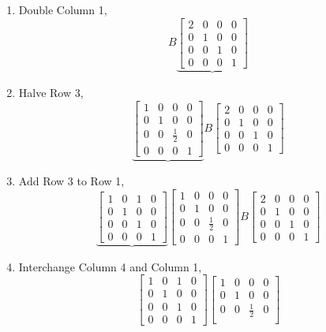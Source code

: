 \documentclass[letterpaper,10pt]{article}
\begin{document}
\begin{enumerate}
\begin{enumerate}
\item Double Column 1,
\[B\underbrace{\begin{bmatrix}
2 & 0 & 0 & 0\\
0 & 1 & 0 & 0\\
0 & 0 & 1 & 0\\
0 & 0 & 0 & 1
\end{bmatrix}} \]
\item Halve Row 3,
\[\underbrace{\begin{bmatrix}
1 & 0 & 0 & 0\\
0 & 1 & 0 & 0\\
0 & 0 & \frac{1}{2} & 0\\
0 & 0 & 0 & 1
\end{bmatrix}}B\begin{bmatrix}
2 & 0 & 0 & 0\\
0 & 1 & 0 & 0\\
0 & 0 & 1 & 0\\
0 & 0 & 0 & 1
\end{bmatrix} \]
\item Add Row 3 to Row 1,
\[\underbrace{\begin{bmatrix}
1 & 0 & 1 & 0\\
0 & 1 & 0 & 0\\
0 & 0 & 1 & 0\\
0 & 0 & 0 & 1
\end{bmatrix}} \begin{bmatrix}
1 & 0 & 0 & 0\\
0 & 1 & 0 & 0\\
0 & 0 & \frac{1}{2} & 0\\
0 & 0 & 0 & 1
\end{bmatrix}B\begin{bmatrix}
2 & 0 & 0 & 0\\
0 & 1 & 0 & 0\\
0 & 0 & 1 & 0\\
0 & 0 & 0 & 1
\end{bmatrix} \]
\item Interchange Column 4 and Column 1,
\[\begin{bmatrix}
1 & 0 & 1 & 0\\
0 & 1 & 0 & 0\\
0 & 0 & 1 & 0\\
0 & 0 & 0 & 1
\end{bmatrix} \begin{bmatrix}
1 & 0 & 0 & 0\\
0 & 1 & 0 & 0\\
0 & 0 & \frac{1}{2} & 0\\

\end{bmatrix}\]
\end{enumerate}
\end{enumerate}
\end{document}

